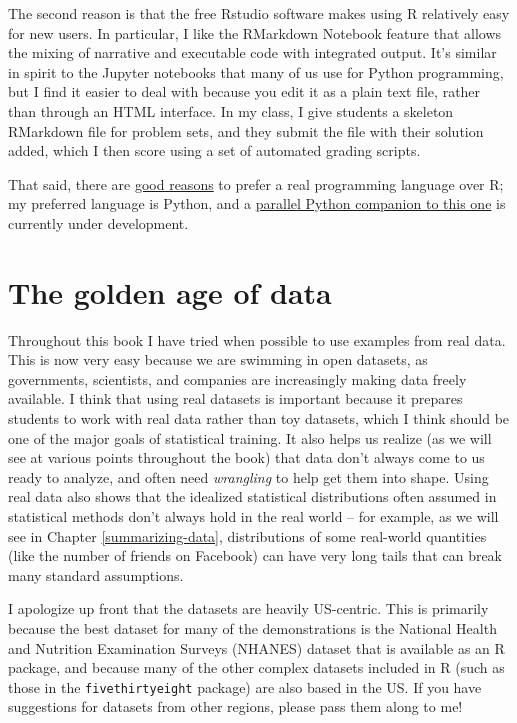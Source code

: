 \documentclass[12pt,]{book}
\begin{document}
The second reason is that the free Rstudio software makes using R relatively easy for new users. In particular, I like the RMarkdown Notebook feature that allows the mixing of narrative and executable code with integrated output. It's similar in spirit to the Jupyter notebooks that many of us use for Python programming, but I find it easier to deal with because you edit it as a plain text file, rather than through an HTML interface. In my class, I give students a skeleton RMarkdown file for problem sets, and they submit the file with their solution added, which I then score using a set of automated grading scripts.

That said, there are \href{https://medium.com/@data_driven/python-vs-r-for-data-science-and-the-winner-is-3ebb1a968197}{good reasons} to prefer a real programming language over R; my preferred language is Python, and a \href{https://github.com/statsthinking21/statsthinking21-python}{parallel Python companion to this one} is currently under development.

\hypertarget{the-golden-age-of-data}{%
\section{The golden age of data}\label{the-golden-age-of-data}}

Throughout this book I have tried when possible to use examples from real data. This is now very easy because we are swimming in open datasets, as governments, scientists, and companies are increasingly making data freely available. I think that using real datasets is important because it prepares students to work with real data rather than toy datasets, which I think should be one of the major goals of statistical training. It also helps us realize (as we will see at various points throughout the book) that data don't always come to us ready to analyze, and often need \emph{wrangling} to help get them into shape. Using real data also shows that the idealized statistical distributions often assumed in statistical methods don't always hold in the real world -- for example, as we will see in Chapter \ref{summarizing-data}, distributions of some real-world quantities (like the number of friends on Facebook) can have very long tails that can break many standard assumptions.

I apologize up front that the datasets are heavily US-centric. This is primarily because the best dataset for many of the demonstrations is the National Health and Nutrition Examination Surveys (NHANES) dataset that is available as an R package, and because many of the other complex datasets included in R (such as those in the \texttt{fivethirtyeight} package) are also based in the US. If you have suggestions for datasets from other regions, please pass them along to me!
\end{document}
